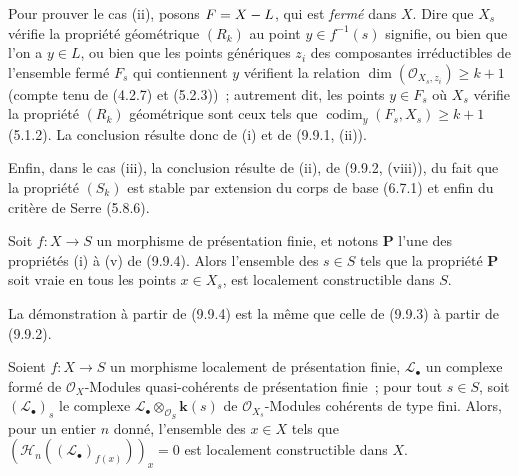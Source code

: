 Pour prouver le cas (ii), posons $F=X- L$, qui est \emph{fermé} dans $X$. Dire
que $X_s$
vérifie la propriété géométrique $(R_k)$ au point $y\in f^{-1}(s)$ signifie, ou
bien que l'on a $y\in L$, ou bien que les points génériques $z_i$ des
composantes irréductibles de l'ensemble fermé $F_s$ qui contiennent $y$
vérifient la relation $\dim(\mathcal O_{X_s,z_i})\geq k+1$ (compte tenu de
(4.2.7) et (5.2.3))~; autrement dit, les points $y\in F_s$ où $X_s$ vérifie la
propriété $(R_k)$ géométrique sont ceux tels que
$\operatorname{codim}_y(F_s,X_s)\geq k+1$ (5.1.2). La conclusion résulte donc
de (i) et de (9.9.1, (ii)).

Enfin, dans le cas (iii), la conclusion résulte de (ii), de (9.9.2, (viii)), du
fait que la propriété $(S_k)$ est stable par extension du corps de base (6.7.1)
et enfin du critère de Serre (5.8.6).

\begin{corollary}[9.9.5]
\label{IV.9.9.5-fr}
Soit $f:X\to S$ un morphisme de présentation finie, et notons $\boldsymbol{P}$
l'une des propriétés \textup{(i)} à \textup{(v)} de \textup{(9.9.4)}. Alors l'ensemble des $s\in S$ tels
que la propriété $\boldsymbol{P}$ soit vraie en tous les points $x\in X_s$, est
localement constructible dans $S$.
\end{corollary}

La démonstration à partir de (9.9.4) est la même que celle de (9.9.3) à partir
de (9.9.2).

\begin{proposition}[9.9.6]
\label{IV.9.9.6-fr}
Soient $f:X\to S$ un morphisme localement de présentation finie,
$\mathcal L_\bullet$ un complexe formé de $\mathcal O_X$-Modules
quasi-cohérents de présentation finie~; pour tout $s\in S$, soit
$(\mathcal L_\bullet)_s$ le complexe
$\mathcal L_\bullet\otimes_{\mathcal O_S}\boldsymbol{k}(s)$ de
$\mathcal O_{X_s}$-Modules cohérents de type fini. Alors, pour un entier $n$
donné, l'ensemble des $x\in X$ tels que
$(\mathcal H_n((\mathcal L_\bullet)_{f(x)}))_x=0$ est localement constructible
dans $X$.
\end{proposition}

